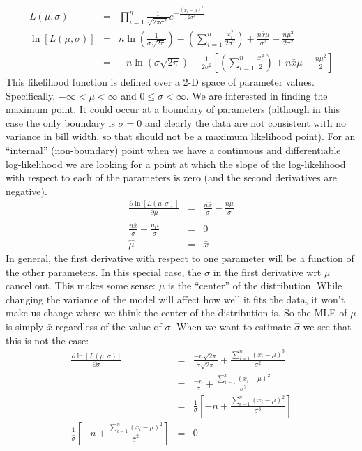 \documentclass[11pt]{article}
\begin{document}
\begin{eqnarray*}
	L(\mu,\sigma) & = & \prod_{i=1}^{n}\frac{1}{\sqrt{2\pi\sigma^2}}e^{-\frac{(x_i-\mu)^2}{2\sigma^2}} \\
	\ln [L(\mu,\sigma)] & = & n\ln\left(\frac{1}{\sigma\sqrt{2\pi}}\right) - \left(\sum_{i=1}^{n}\frac{x_i^2}{2\sigma^2}\right) + \frac{n\bar{x}\mu}{\sigma^2} - \frac{n\mu^2}{2\sigma^2}\\
		& = & -n\ln\left(\sigma\sqrt{2\pi}\right) - \frac{1}{2\sigma^2}\left[\left(\sum_{i=1}^{n}\frac{x_i^2}{2}\right) + n\bar{x}\mu - \frac{n\mu^2}{2}\right]
\end{eqnarray*}
This likelihood function is defined over a 2-D space of parameter values.  Specifically, $-\infty<\mu<\infty$ and $0\leq\sigma<\infty$.
We are interested in finding the maximum point. 
It could occur at a boundary of parameters (although in this case the only boundary is $\sigma=0$ and clearly the data are not consistent with no variance in bill width, so that should not be a maximum likelihood point).
For an ``internal'' (non-boundary) point when we have a continuous and differentiable log-likelihood we are looking for a point at which the slope of the log-likelihood with respect to each of the parameters is zero (and the second derivatives are negative).
\begin{eqnarray*}
	\frac{\partial\ln [L(\mu,\sigma)]}{\partial \mu} & = & \frac{n\bar{x}}\sigma - \frac{n\mu}{\sigma} \\
	\frac{n\bar{x}}\sigma - \frac{n\hat{\mu}}{\sigma} & = & 0\\ 
	\hat{\mu} & = & \bar{x}
\end{eqnarray*}
In general, the first derivative with respect to one parameter will be a function of the other parameters. 
In this special case, the $\sigma$ in the first derivative wrt $\mu$ cancel out.
This makes some sense: $\mu$ is the ``center'' of the distribution. 
While changing the variance of the model will affect how well it fits the data, it won't make us change where we think the center of the distribution is. 
So the MLE of $\mu$ is simply $\bar{x}$ regardless of the value of $\sigma$.
When we want to estimate $\hat{\sigma}$ we see that this is not the case:
\begin{eqnarray*}
	\frac{\partial\ln [L(\mu,\sigma)]}{\partial \sigma} & = & \frac{-n\sqrt{2\pi}}{\sigma\sqrt{2\pi}} + \frac{\sum_{i=1}^n\left(x_i-\mu\right)^3}{\sigma^2} \\
	 & = & \frac{-n}{\sigma} + \frac{\sum_{i=1}^n\left(x_i-\mu\right)^2}{\sigma^3} \\
	 & = & \frac{1}{\sigma}\left[ -n+ \frac{\sum_{i=1}^n\left(x_i-\mu\right)^2}{\sigma^3}\right] \\
	 \frac{1}{\hat{\sigma}}\left[ -n+ \frac{\sum_{i=1}^n\left(x_i-\mu\right)^2}{\hat{\sigma}^2}\right] & = & 0
\end{eqnarray*}
\end{document}
